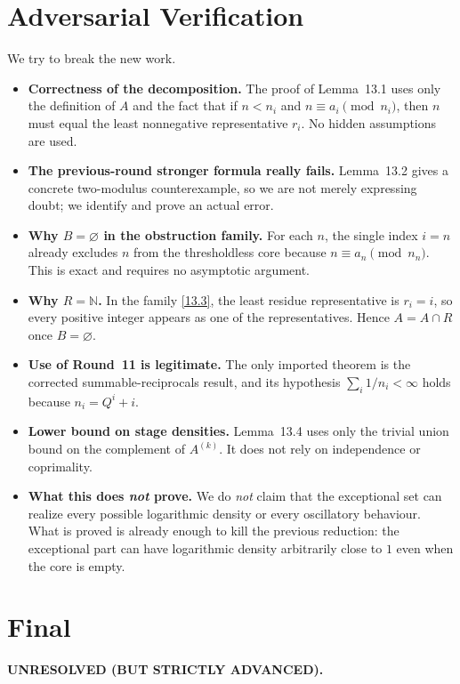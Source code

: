 \section{Adversarial Verification}
We try to break the new work.
\begin{itemize}
\item \textbf{Correctness of the decomposition.}  The proof of Lemma~13.1 uses only the definition of \(A\) and the fact that if \(n<n_i\) and \(n\equiv a_i\pmod{n_i}\), then \(n\) must equal the least nonnegative representative \(r_i\).  No hidden assumptions are used.

\item \textbf{The previous-round stronger formula really fails.}  Lemma~13.2 gives a concrete two-modulus counterexample, so we are not merely expressing doubt; we identify and prove an actual error.

\item \textbf{Why \(B=\varnothing\) in the obstruction family.}  For each \(n\), the single index \(i=n\) already excludes \(n\) from the thresholdless core because \(n\equiv a_n\pmod{n_n}\).  This is exact and requires no asymptotic argument.

\item \textbf{Why \(R=\mathbb N\).}  In the family \eqref{13.3}, the least residue representative is \(r_i=i\), so every positive integer appears as one of the representatives.  Hence \(A=A\cap R\) once \(B=\varnothing\).

\item \textbf{Use of Round~11 is legitimate.}  The only imported theorem is the corrected summable-reciprocals result, and its hypothesis
\(
\sum_i 1/n_i<\infty
\)
holds because \(n_i=Q^i+i\).

\item \textbf{Lower bound on stage densities.}  Lemma~13.4 uses only the trivial union bound on the complement of \(A^{(k)}\).  It does not rely on independence or coprimality.

\item \textbf{What this does \emph{not} prove.}  We do \emph{not} claim that the exceptional set can realize every possible logarithmic density or every oscillatory behaviour.  What is proved is already enough to kill the previous reduction: the exceptional part can have logarithmic density arbitrarily close to \(1\) even when the core is empty.
\end{itemize}

\section{Final}
\textbf{UNRESOLVED (BUT STRICTLY ADVANCED).}


